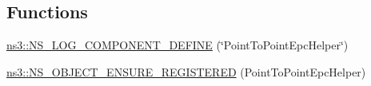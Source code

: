 \subsection*{Functions}
\begin{DoxyCompactItemize}
\item 
\hyperlink{namespacens3_a8c109858d0a5301c8d14ad675e06ae05}{ns3\+::\+N\+S\+\_\+\+L\+O\+G\+\_\+\+C\+O\+M\+P\+O\+N\+E\+N\+T\+\_\+\+D\+E\+F\+I\+NE} (\char`\"{}Point\+To\+Point\+Epc\+Helper\char`\"{})
\item 
\hyperlink{namespacens3_a8fba733c64942cae2ae747ce3eebb686}{ns3\+::\+N\+S\+\_\+\+O\+B\+J\+E\+C\+T\+\_\+\+E\+N\+S\+U\+R\+E\+\_\+\+R\+E\+G\+I\+S\+T\+E\+R\+ED} (Point\+To\+Point\+Epc\+Helper)
\end{DoxyCompactItemize}
